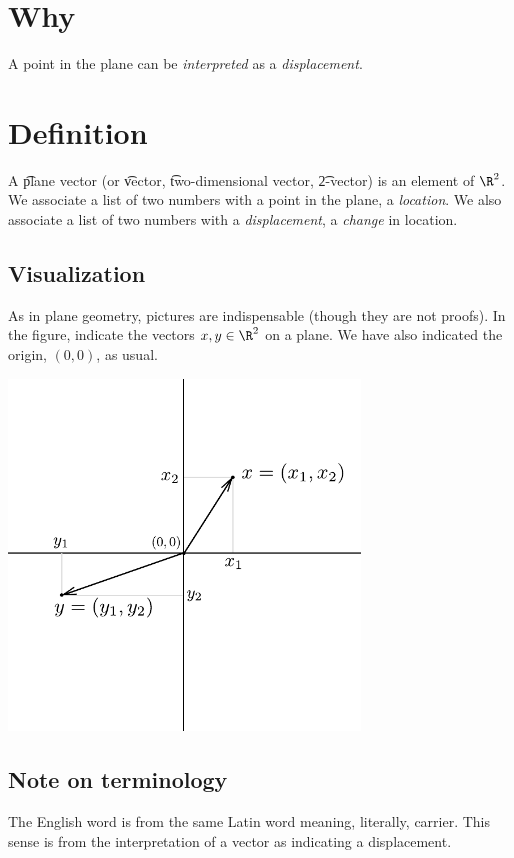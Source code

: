 

\section*{Why}

A point in the plane can be \textit{interpreted} as a \textit{displacement}.

\section*{Definition}

A \t{plane vector} (or \t{vector}, \t{two-dimensional vector}, \t{2-vector}) is an element of $\R ^2$.
We associate a list of two numbers with a point in the plane, a \textit{location}.
We also associate a list of two numbers with a \textit{displacement}, a \textit{change} in location.

\subsection*{Visualization}

As in plane geometry, pictures are indispensable (though they are not proofs).
In the figure, indicate the vectors $x, y \in \R ^2$ on a plane.
We have also indicated the origin, $(0, 0)$, as usual.
\begin{center}  \includegraphics[width=0.70\textwidth]{./graphics/vector_components.pdf}\end{center}

\subsection*{Note on terminology}

The English word  is from the same Latin word  meaning, literally, carrier.
This sense is from the interpretation of a vector as indicating a displacement.
